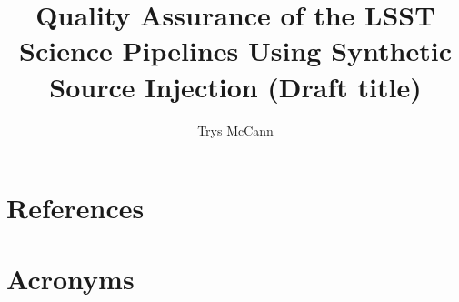 \documentclass[DM,authoryear,toc]{lsstdoc}
\title{Quality Assurance of the LSST Science Pipelines Using Synthetic Source Injection (Draft title)}
\author{%
Trys McCann
}
\date{\vcsDate}
\begin{document}
\maketitle


\appendix
\section{References} \label{sec:bib}
\renewcommand{\refname}{} %


\section{Acronyms} \label{sec:acronyms}

\end{document}
